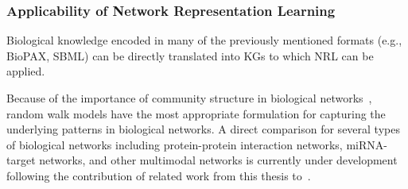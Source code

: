 \subsubsection{Applicability of Network Representation Learning}

Biological knowledge encoded in many of the previously mentioned formats (e.g., \ac{BioPAX}, \ac{SBML}) can be directly translated into \acp{KG} to which \ac{NRL} can be applied.

Because of the importance of community structure in biological networks~\cite{Girvan2002}, random walk models have the most appropriate formulation for capturing the underlying patterns in biological networks.
A direct comparison for several types of biological networks including protein-protein interaction networks, miRNA-target networks, and other multimodal networks is currently under development following the contribution of related work from this thesis to~\cite{Ali2019}.
